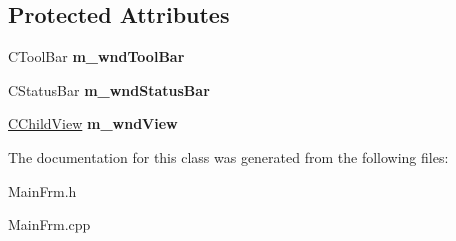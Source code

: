 \subsection*{Protected Attributes}
\begin{DoxyCompactItemize}
\item 
\mbox{\label{class_c_main_frame_a73024d794dce2fe918f6b117371c25fc}} 
C\+Tool\+Bar {\bfseries m\+\_\+wnd\+Tool\+Bar}
\item 
\mbox{\label{class_c_main_frame_ac01bafc03aee69cf982e6f029b4db6b0}} 
C\+Status\+Bar {\bfseries m\+\_\+wnd\+Status\+Bar}
\item 
\mbox{\label{class_c_main_frame_a7c3af9327c496f8c807d578f7a4ef4c5}} 
\mbox{\hyperlink{class_c_child_view}{C\+Child\+View}} {\bfseries m\+\_\+wnd\+View}
\end{DoxyCompactItemize}


The documentation for this class was generated from the following files\+:\begin{DoxyCompactItemize}
\item 
Main\+Frm.\+h\item 
Main\+Frm.\+cpp\end{DoxyCompactItemize}
